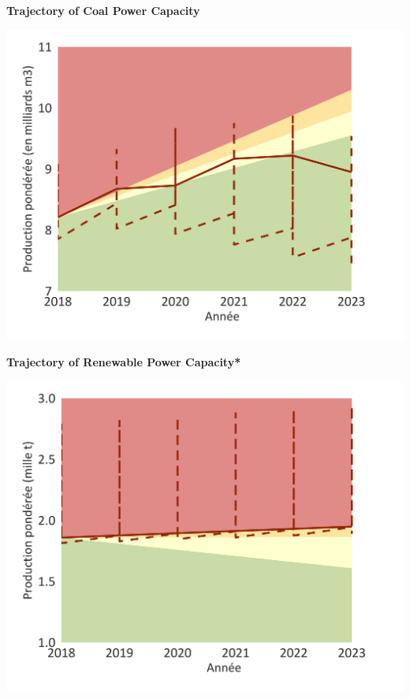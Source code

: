 \documentclass[10pt,table,a4]{article}\usepackage[]{graphicx}\usepackage[]{color}
\begin{document}
	\begin{minipage}[t]{.49\linewidth}
		\textbf{Trajectory of Coal Power Capacity }
		
		\includegraphics[trim = {0 0cm 0 0},width=1\linewidth]{ReportOutputs/Fig22}
		
		\textbf{Trajectory of Renewable Power Capacity* }
		
		\includegraphics[trim = {0 0cm 0 0},width=.99\linewidth]{ReportOutputs/Fig23}
	\end{minipage}	
	\hspace{.02\linewidth}
\end{document}

